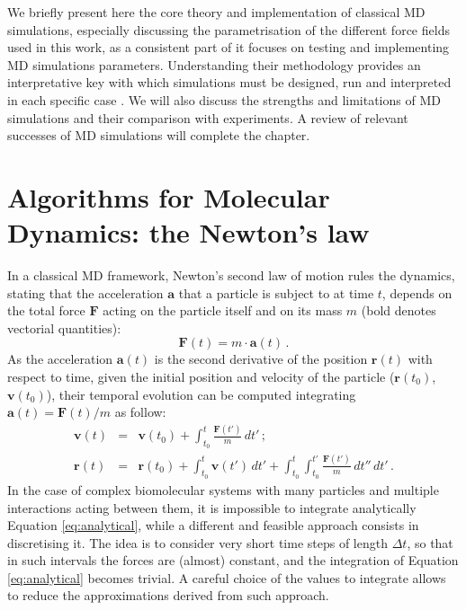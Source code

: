 We briefly present here the core theory and implementation of classical MD simulations, especially discussing the parametrisation of the different force fields used in this work, as a consistent part of it focuses on testing and implementing MD simulations parameters. Understanding their methodology provides an interpretative key with which simulations must be designed, run and interpreted in each specific case \citep{vanGunsteren2006}. We will also discuss the strengths and limitations of MD simulations and their comparison with experiments. A review of relevant successes of MD simulations will complete the chapter.


\section{Algorithms for Molecular Dynamics: the Newton's law} \label{sec:md_algos}
In a classical MD framework, Newton's second law of motion rules the dynamics, stating that the acceleration $\textbf{a}$ that a particle is subject to at time $t$, depends on the total force $\textbf{F}$ acting on the particle itself and on its mass $m$ (bold denotes vectorial quantities):
\begin{equation} \label{eq:newton}
\textbf{F}(t) =  m \cdot \textbf{a}(t) \, .
\end{equation}
As the acceleration $\textbf{a}(t)$ is the second derivative of the position $\textbf{r}(t)$ with respect to time, given the initial position and velocity of the particle ($\textbf{r}(t_0)$, $\textbf{v}(t_0)$), their temporal evolution can be computed integrating $\textbf{a}(t) = \textbf{F}(t)/m$ as follow:
\begin{eqnarray} \label{eq:analytical}
\mathbf{v}(t) &=& \mathbf{v}(t_0) + \int_{t_0}^t \frac{\mathbf{F}(t')}{m} \, dt' \, ; \\
\mathbf{r}(t) &=& \mathbf{r}(t_0) + \int_{t_0}^t \mathbf{v}(t') \, dt' + \int_{t_0}^t \int_{t_0}^{t'} \frac{\mathbf{F}(t')}{m} \, dt'' \, dt'\, .
\end{eqnarray}
In the case of complex biomolecular systems with many particles and multiple interactions acting between them, it is impossible to integrate analytically Equation \ref{eq:analytical}, while a different and feasible approach consists in discretising it.
%
The idea is to consider very short time steps of length $\Delta t$, so that in such intervals the forces are (almost) constant, and the integration of Equation \ref{eq:analytical} becomes trivial.
%
A careful choice of the values to integrate allows to reduce the approximations derived from such approach.

